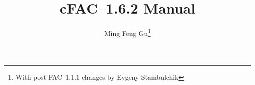 \documentclass[twoside,a4paper]{refrep}
\newcommand{\cFAC}{{cFAC}\xspace}
\newcommand{\facversion}{{1.6.2}\xspace}
\newcounter{faq}[section]
\newcommand{\+}{\discretionary{\mbox{\scriptsize$\hookleftarrow$}}{}{}}
\begin{document}
\title{\cFAC--\facversion Manual}
\author{Ming Feng Gu\thanks{With post-FAC--1.1.1 changes by Evgeny Stambulchik}}

\date{}

\maketitle

\tableofcontents

















\printindex


\end{document}
